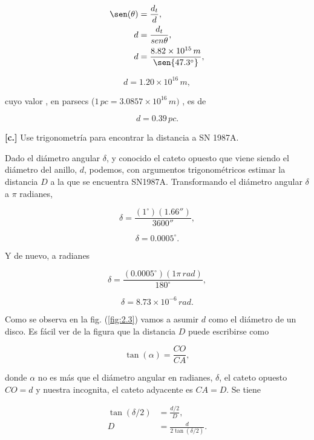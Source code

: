\documentclass[paper=a4, fontsize=10pt]{scrartcl} %
\begin{document}
\begin{align*}
\sen(\theta) & = \frac{d_t}{d}, \\
d & = \frac{d_t}{sen{\theta}}, \\
d & = \frac{8.82 \times 10^{15} \, m}{\sen{47.3^{\circ}}},
\end{align*}

\begin{equation*}
d = 1.20 \times 10^{16} \, m,
\end{equation*}

cuyo valor , en parsecs ($1 \, pc = 3.0857 \times 10^{16} \, m)$ , es de

\begin{equation} \label{eq:2.9}
d = 0.39 \, pc.
\end{equation}

\vspace{0.3cm} 


{\bf{[c.]}} Use trigonometría para encontrar la distancia a SN 1987A.

\vspace{0.3cm} 

Dado el diámetro angular $\delta$, y conocido el cateto opuesto que viene siendo el diámetro del anillo, $d$, podemos, con argumentos trigonométricos estimar  la distancia $D$ a la que se encuentra SN1987A. Transformando el diámetro angular $\delta$ a $\pi $ radianes, 

$$\delta = \frac{(1^{\circ})(1.66'')}{3600''},$$

$$\delta = 0.0005^{\circ}.$$

Y de nuevo, a radianes

$$ \delta = \frac{(0.0005^{\circ})(1 \pi \, rad)}{180^{\circ}},$$

\begin{equation} \label{eq:2.10}
\delta = 8.73 \times 10^{-6} \, rad.
\end{equation}


Como se observa en la fig. (\ref{fig:2.3}) vamos a asumir $d$ como el diámetro de un disco. Es fácil ver de la figura que la distancia $D$ puede escribirse como

$$ \tan(\alpha) = \frac{CO}{CA},$$

donde $\alpha$ no es más que el diámetro angular en radianes, $\delta$, el cateto opuesto  $CO = d$ y nuestra incognita, el cateto adyacente es $CA = D$. Se tiene

\begin{align*}
\tan(\delta/2) & = \frac{d/2}{D}, \\
D & = \frac{d}{2 \tan(\delta/2)}.
\end{align*}
\end{document}
